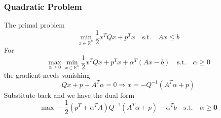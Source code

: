 \documentclass{article}
\begin{document}
            \subsubsection{Quadratic Problem}
                The primal problem
                \[
                    \min_{x\in\mathbb{R}^n} \frac{1}{2} x^T Q x + p^T x \mathrm{\quad s.t. \quad} Ax\leq b
                \]
                For
                \[
                    \max_{\alpha\geq 0}\min_{x\in\mathbb{R}^n} \frac{1}{2} x^T Q x + p^T x + \alpha^T (Ax - b) \mathrm{\quad s.t. \quad} \alpha \geq 0
                \]
                the gradient needs vanishing
                \[
                    Qx + p + A^T \alpha = 0 \Rightarrow x = -Q^{-1}(A^T \alpha + p)
                \]
                Substitute back and we have the dual form
                \[
                    \max -\frac{1}{2}(p^T + \alpha^T A) Q^{-1} (A^T\alpha + p) - \alpha^T b \mathrm{\quad s.t. \quad} \alpha \geq \mathbf{0} 
                \]
\end{document}
